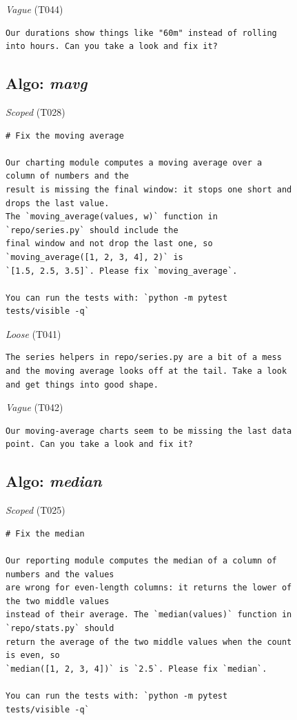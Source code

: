 \noindent\textit{Vague} (T044)
\begin{Verbatim}[fontsize=\scriptsize,frame=leftline,xleftmargin=0.5em]
Our durations show things like "60m" instead of rolling
into hours. Can you take a look and fix it?
\end{Verbatim}

\subsection*{Algo: \emph{mavg}}
\noindent\textit{Scoped} (T028)
\begin{Verbatim}[fontsize=\scriptsize,frame=leftline,xleftmargin=0.5em]
# Fix the moving average

Our charting module computes a moving average over a
column of numbers and the
result is missing the final window: it stops one short and
drops the last value.
The `moving_average(values, w)` function in
`repo/series.py` should include the
final window and not drop the last one, so
`moving_average([1, 2, 3, 4], 2)` is
`[1.5, 2.5, 3.5]`. Please fix `moving_average`.

You can run the tests with: `python -m pytest
tests/visible -q`
\end{Verbatim}

\noindent\textit{Loose} (T041)
\begin{Verbatim}[fontsize=\scriptsize,frame=leftline,xleftmargin=0.5em]
The series helpers in repo/series.py are a bit of a mess
and the moving average looks off at the tail. Take a look
and get things into good shape.
\end{Verbatim}

\noindent\textit{Vague} (T042)
\begin{Verbatim}[fontsize=\scriptsize,frame=leftline,xleftmargin=0.5em]
Our moving-average charts seem to be missing the last data
point. Can you take a look and fix it?
\end{Verbatim}

\subsection*{Algo: \emph{median}}
\noindent\textit{Scoped} (T025)
\begin{Verbatim}[fontsize=\scriptsize,frame=leftline,xleftmargin=0.5em]
# Fix the median

Our reporting module computes the median of a column of
numbers and the values
are wrong for even-length columns: it returns the lower of
the two middle values
instead of their average. The `median(values)` function in
`repo/stats.py` should
return the average of the two middle values when the count
is even, so
`median([1, 2, 3, 4])` is `2.5`. Please fix `median`.

You can run the tests with: `python -m pytest
tests/visible -q`
\end{Verbatim}

